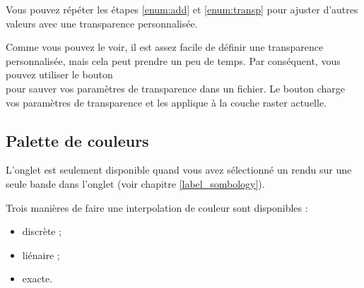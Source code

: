 Vous pouvez répéter les étapes \ref{enum:add} et \ref{enum:transp} pour ajuster d'autres valeurs avec une transparence personnalisée. 

Comme vous pouvez le voir, il est assez facile de définir une transparence
personnalisée, mais cela peut prendre un peu de temps. Par conséquent, vous pouvez utiliser le bouton\\  pour sauver vos paramètres de transparence dans un fichier. Le bouton  charge vos paramètres de transparence et les applique à la couche raster actuelle.

 \subsection{Palette de couleurs} \label{label_colormaptab}

L'onglet  est seulement disponible quand vous avez sélectionné un rendu sur une seule bande dans l'onglet  (voir chapitre \ref{label_sombology}).

Trois manières de faire une interpolation de couleur sont disponibles :
\begin{itemize}[label=--]
\item discrète ;
\item liénaire ;
\item exacte.
\end{itemize}

